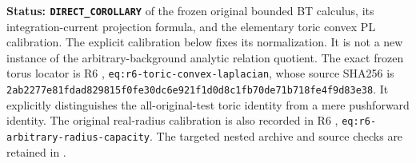 \noindent\textbf{Status: \texttt{DIRECT\_COROLLARY}} of the
frozen original bounded BT calculus, its integration-current
projection formula, and the elementary toric convex PL calibration.
The explicit calibration below fixes its normalization. It is not a
new instance of the arbitrary-background analytic relation quotient.
The exact frozen torus locator is R6
,
\texttt{eq:r6-toric-convex-laplacian}, whose source SHA256 is
\texttt{2ab2277e81fdad829815f0fe30dc6e921f1d0d8c1fb70de71b718fe4f9d83e38}.
It explicitly distinguishes the all-original-test toric identity
from a mere pushforward identity. The original real-radius
calibration is also recorded in R6
,
\texttt{eq:r6-arbitrary-radius-capacity}. The targeted nested
archive and source checks are retained in
.

